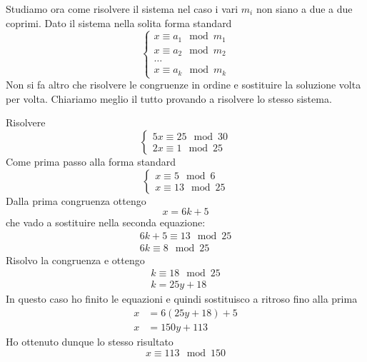 Studiamo ora come risolvere il sistema nel caso i vari $m_i$ non siano a due a due coprimi.
Dato il sistema nella solita forma standard
\begin{equation*}
	\begin{cases}
		x \equiv a_1 \mod{m_1} \\
		x \equiv a_2 \mod{m_2} \\
		\dots                  \\
		x \equiv a_k \mod{m_k}
	\end{cases}
\end{equation*}
Non si fa altro che risolvere le congruenze in ordine e sostituire la soluzione volta per volta.
Chiariamo meglio il tutto provando a risolvere lo stesso sistema.
\begin{example}
	Risolvere
	\begin{equation*}
		\begin{cases}
			5x \equiv 25 \mod{30} \\
			2x \equiv 1 \mod{25}
		\end{cases}
	\end{equation*}
	Come prima passo alla forma standard
	\begin{equation*}
		\begin{cases}
			x \equiv 5 \mod{6} \\
			x \equiv 13 \mod{25}
		\end{cases}
	\end{equation*}
	Dalla prima congruenza ottengo
	\begin{equation*}
		x = 6k + 5
	\end{equation*}
	che vado a sostituire nella seconda equazione:
	\begin{equation*}
		\begin{array}{l}
			6k + 5 \equiv 13 \mod{25} \\
			6k \equiv 8 \mod{25}
		\end{array}
	\end{equation*}
	Risolvo la congruenza e ottengo
	\begin{equation*}
		\begin{array}{l}
			k \equiv 18 \mod{25} \\
			k = 25y + 18
		\end{array}
	\end{equation*}
	In questo caso ho finito le equazioni e quindi sostituisco a ritroso fino alla prima
	\begin{equation*}
		\begin{array}{ll}
			x & = 6(25y + 18) + 5 \\
			x & = 150y + 113
		\end{array}
	\end{equation*}
	Ho ottenuto dunque lo stesso risultato
	\begin{equation*}
		x \equiv 113 \mod{150}
	\end{equation*}
\end{example}

